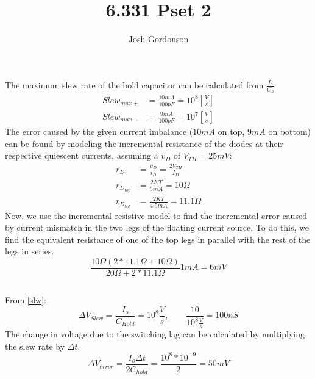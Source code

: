 \documentclass{article}
\author{Josh Gordonson}
\title{6.331 Pset 2}
\begin{document}
\maketitle{}
\section{}
\subsection{}
The maximum slew rate of the hold capacitor can be calculated from $\frac{I_o}{C_h}$
\begin{align*}
Slew_{max+} & = \frac{10mA}{100pF} = 10^8 [\frac{V}{s}] \tag{1} \label{slw}\\
Slew_{max-} & = \frac{9mA}{100pF} = 10^7 [\frac{V}{s}] 
\end{align*}
The error caused by the given current imbalance ($10mA$ on top, $9mA$ on bottom) can 
be found by modeling the incremental resistance of the diodes at their respective 
quiescent currents, assuming a $v_D$ of $V_{TH} = 25mV$:
\begin{align*}
r_D &= \frac{v_D}{i_D} = \frac{2V_{TH}}{I_D} \\
r_{D_{top}} &= \frac{2KT}{5mA} = 10 \Omega \tag{2} \label{incres}\\
r_{D_{bot}} &= \frac{2KT}{4.5mA} = 11.1 \Omega 
\end{align*}
Now, we use the incremental resistive model to find the incremental error caused by 
current mismatch in the two legs of the floating current source. To do this, we find 
the equivalent resistance of one of the top legs in parallel with the rest of the legs in series.
$$
\frac{10 \Omega (2*11.1 \Omega+10 \Omega)}{20 \Omega+2*11.1 \Omega}1mA = 6mV
$$
\subsection{}
From \eqref{slw}:
$$
\Delta V_{Slew} = \frac{I_o}{C_{Hold}} = 10^8 \frac{V}{s}, \qquad \frac{10}{10^8 \frac{V}{s}}=100nS
$$
The change in voltage due to the switching lag can be calculated by multiplying the slew rate by
$\Delta t$.
$$
\Delta V_{error} = \frac{I_o \Delta t}{2C_{hold}} = \frac{10^8*10^{-9}}{2} = 50mV
$$
\end{document}
